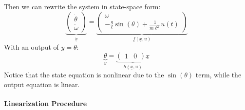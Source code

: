 ﻿\documentclass[12pt]{article}
\begin{document}
Then we can rewrite the system in state-space form:
\[
\underbrace{
\begin{pmatrix}
\dot{\theta}\\
\dot{\omega}
\end{pmatrix}
}_{\dot{\underline{x}}}
=
\underbrace{
\begin{pmatrix}
\omega\\
-\frac{g}{\ell}\sin(\theta)+\frac{1}{m\ell^2}u(t)
\end{pmatrix}
}_{\underline{f}(\underline{x},u)}
\]
With an output of $y=\theta$:
\[
\underbrace{\theta}_{y}
=
\underbrace{
\begin{pmatrix}
1 & 0
\end{pmatrix}
\underline{x}
}_{h(\underline{x},u)}
\]
Notice that the state equation is nonlinear due to the $\sin(\theta)$ term, while the output equation is linear.\\\\
\textbf{Linearization Procedure}
\end{document}
